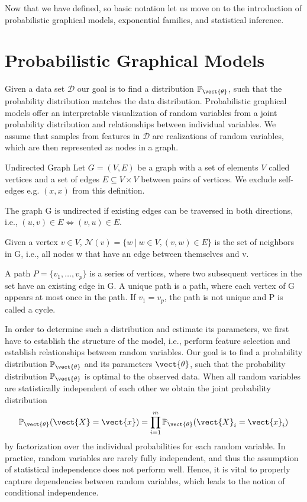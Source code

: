     Now that we have defined, so basic notation let us move on to the introduction of probabilistic graphical models, exponential families, and statistical inference.


\section{Probabilistic Graphical Models}
\label{sec:pgm}
Given a data set $\mathcal{D}$ our goal is to find a distribution $\mathbb{P}_{\vect{\theta}}$, such that the probability distribution matches the data distribution.
Probabilistic graphical models offer an interpretable visualization of random variables from a joint probability distribution and relationships between individual variables.
We assume that samples from features in $\mathcal{D}$ are realizations of random variables, which are then represented as nodes in a graph.
    \begin{definition}{Undirected Graph}
        Let $G=(V,E)$ be a graph with a set of elements $V$ called vertices and a set of edges $E \subseteq V \times V$ between pairs of vertices. 
        We exclude self-edges e.g. $(x,x)$ from this definition.

        The graph G is undirected if existing edges can be traversed in both directions, i.e., $(u,v) \in E \Leftrightarrow (v,u) \in E$.

        Given a vertex $v \in V$, $\mathcal{N}(v) = \{w \:\lvert\: w \in V, (v,w) \in E\}$ is the set of neighbors in G, i.e., all nodes w that have an edge between themselves and v.

        A path $P = \{v_1, \ldots, v_p\}$ is a series of vertices, where two subsequent vertices in the set have an existing edge in G. 
        A unique path is a path, where each vertex of G appears at most once in the path.
        If $v_1 = v_p$, the path is not unique and P is called a cycle.
    \end{definition}
In order to determine such a distribution and estimate its parameters, we first have to establish the structure of the model, i.e., perform feature selection and establish relationships between random variables.
Our goal is to find a probability distribution $\mathbb{P}_{\vect{\theta}}$ and its parameters $\vect{\theta}$, such that the probability distribution $\mathbb{P}_{\vect{\theta}}$ is optimal \wrt to the observed data.
When all random variables are statistically independent of each other  we obtain the joint probability distribution
\begin{equation}
    \mathbb{P}_{\vect{\theta}}(\vect{X} = \vect{x}) = \prod_{i=1}^m \mathbb{P}_{\vect{\theta}}(\vect{X}_i = \vect{x}_i)
\end{equation}
by factorization over the individual probabilities for each random variable.
In practice, random variables are rarely fully independent, and thus the assumption of statistical independence does not perform well.
Hence, it is vital to properly capture dependencies between random variables, which leads to the notion of conditional independence.

